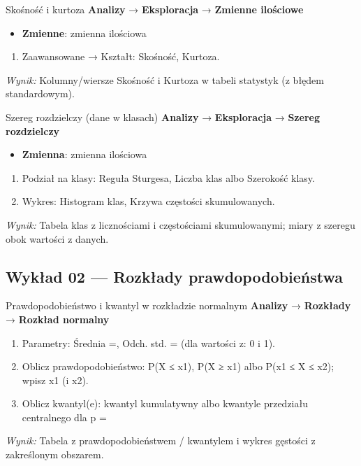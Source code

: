 \documentclass[
  polish,
  10pt,
  a4paper,
  DIV=11,
  numbers=noendperiod]{scrartcl}
\newcommand{\jmenu}[1]{{\color{upwraccent}\small #1}}
\begin{document}
\begin{jbox}{Skośność i kurtoza}\label{w:ksztalt}
\jmenu{\textbf{Analizy} → \textbf{Eksploracja} → \textbf{Zmienne ilościowe}}

\begin{itemize}
\item[$\triangleright$] \textbf{Zmienne}: zmienna ilościowa
\end{itemize}
\begin{enumerate}
\item Zaawansowane → Kształt: Skośność, Kurtoza.
\end{enumerate}
\textit{Wynik:} Kolumny/wiersze Skośność i Kurtoza w tabeli statystyk (z błędem standardowym).

\end{jbox}

\begin{jbox}{Szereg rozdzielczy (dane w klasach)}\label{w:szereg-rozdzielczy}
\jmenu{\textbf{Analizy} → \textbf{Eksploracja} → \textbf{Szereg rozdzielczy}}

\begin{itemize}
\item[$\triangleright$] \textbf{Zmienna}: zmienna ilościowa
\end{itemize}
\begin{enumerate}
\item Podział na klasy: Reguła Sturgesa, Liczba klas albo Szerokość klasy.
\item Wykres: Histogram klas, Krzywa częstości skumulowanych.
\end{enumerate}
\textit{Wynik:} Tabela klas z licznościami i częstościami skumulowanymi; miary z szeregu obok wartości z danych.

\end{jbox}


\subsection{Wykład 02 --- Rozkłady
prawdopodobieństwa}\label{wykux142ad-02-rozkux142ady-prawdopodobieux144stwa}

\begin{jbox}{Prawdopodobieństwo i kwantyl w rozkładzie normalnym}\label{w:rozklad-normalny}
\jmenu{\textbf{Analizy} → \textbf{Rozkłady} → \textbf{Rozkład normalny}}

\begin{enumerate}
\item Parametry: Średnia =, Odch. std. = (dla wartości z: 0 i 1).
\item Oblicz prawdopodobieństwo: P(X ≤ x1), P(X ≥ x1) albo P(x1 ≤ X ≤ x2); wpisz x1 (i x2).
\item Oblicz kwantyl(e): kwantyl kumulatywny albo kwantyle przedziału centralnego dla p =
\end{enumerate}
\textit{Wynik:} Tabela z prawdopodobieństwem / kwantylem i wykres gęstości z zakreślonym obszarem.

\end{jbox}
\end{document}
